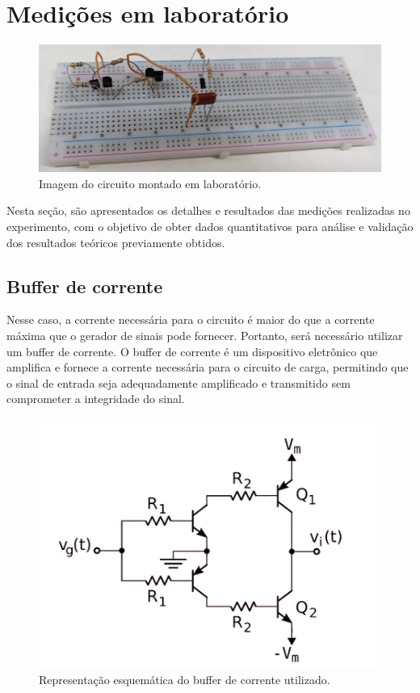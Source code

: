 \newpage

\section{Medições em laboratório}

\begin{figure}[h]
    \centering
    \includegraphics[width=0.7\columnwidth]{images/circuito_montado.png}
    \caption{Imagem do circuito montado em laboratório.}
\end{figure}

Nesta seção, são apresentados os detalhes e resultados das medições realizadas no experimento, com o objetivo de obter dados quantitativos para análise e validação dos resultados teóricos previamente obtidos.

\subsection{Buffer de corrente}

Nesse caso, a corrente necessária para o circuito é maior do que a corrente máxima que o gerador de sinais pode fornecer. Portanto, será necessário utilizar um buffer de corrente. O buffer de corrente é um dispositivo eletrônico que amplifica e fornece a corrente necessária para o circuito de carga, permitindo que o sinal de entrada seja adequadamente amplificado e transmitido sem comprometer a integridade do sinal.

\begin{figure}[h]
    \centering
    \includegraphics[width=0.7\columnwidth]{images/buffer_corrente.png}
    \caption{Representação esquemática do buffer de corrente utilizado.}
\end{figure}

